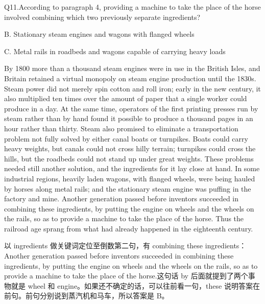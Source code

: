 \begin{blk}
    \begin{qst}
        Q11.According to paragraph 4, providing a machine to take the place of the horse involved combining which two previously separate ingredients?
    \end{qst}

    \begin{chc}
        B. Stationary steam engines and wagons with flanged wheels

        C. Metal rails in roadbeds and wagons capable of carrying heavy loads
    \end{chc}

    \begin{psgq}
        By 1800 more than a thousand steam engines were in use in the British Isles, and Britain retained a virtual monopoly on steam engine production until the 1830s. Steam power did not merely spin cotton and roll iron; early in the new century, it also multiplied ten times over the amount of paper that a single worker could produce in a day. At the same time, operators of the first printing presses run by steam rather than by hand found it possible to produce a thousand pages in an hour rather than thirty. Steam also promised to eliminate a transportation problem not fully solved by either canal boats or turnpikes. Boats could carry heavy weights, but canals could not cross hilly terrain; turnpikes could cross the hills, but the roadbeds could not stand up under great weights. These problems needed still another solution, and the ingredients for it lay close at hand. In some industrial regions, heavily laden wagons, with flanged wheels, were being hauled by horses along metal rails; and the stationary steam engine was puffing in the factory and mine. Another generation passed before inventors succeeded in combining these ingredients, by putting the engine on wheels and the wheels on the rails, so as to provide a machine to take the place of the horse. Thus the railroad age sprang from what had already happened in the eighteenth century.
    \end{psgq}

    \begin{nlz}
        以 ingredients 做关键词定位至倒数第二句，有 combining these ingredients：Another generation passed before inventors succeeded in combining these ingredients, by putting the engine on wheels and the wheels on the rails, so as to provide a machine to take the place of the horse.这句话 by 后面就提到了两个事物就是 wheel 和 engine。如果还不确定的话，可以往前看一句，these 说明答案在前句。前句分别说到蒸汽机和马车，所以答案是 B。
    \end{nlz}
\end{blk}

